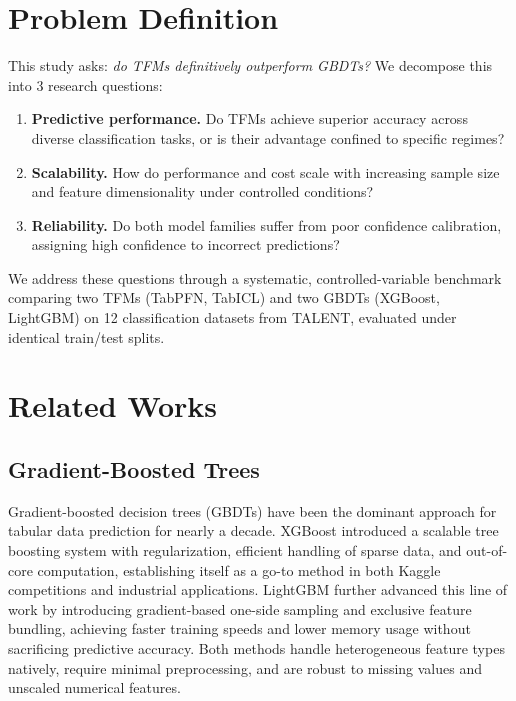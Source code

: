\documentclass{SYSUReport}
\begin{document}
%
%

\section{Problem Definition}
\label{sec:problem-definition}

This study asks: \textit{do TFMs definitively outperform GBDTs?} We decompose this into 3 research questions:

\begin{enumerate}
    \item \textbf{Predictive performance.} Do TFMs achieve superior accuracy across diverse classification tasks, or is their advantage confined to specific regimes?
    \item \textbf{Scalability.} How do performance and cost scale with increasing sample size and feature dimensionality under controlled conditions?
    \item \textbf{Reliability.} Do both model families suffer from poor confidence calibration, assigning high confidence to incorrect predictions?
\end{enumerate}

We address these questions through a systematic, controlled-variable benchmark comparing two TFMs (TabPFN, TabICL) and two GBDTs (XGBoost, LightGBM) on 12 classification datasets from TALENT, evaluated under identical train/test splits.


%
%


\section{Related Works}


\subsection{Gradient-Boosted Trees}
Gradient-boosted decision trees (GBDTs) have been the dominant approach for tabular data prediction for nearly a decade. XGBoost introduced a scalable tree boosting system with regularization, efficient handling of sparse data, and out-of-core computation, establishing itself as a go-to method in both Kaggle competitions and industrial applications. LightGBM further advanced this line of work by introducing gradient-based one-side sampling and exclusive feature bundling, achieving faster training speeds and lower memory usage without sacrificing predictive accuracy. Both methods handle heterogeneous feature types natively, require minimal preprocessing, and are robust to missing values and unscaled numerical features. 
\end{document}
